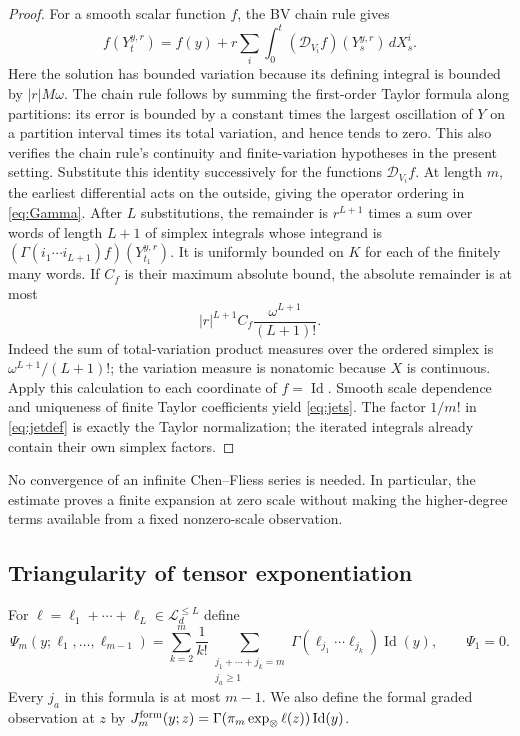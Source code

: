 \documentclass[11pt,a4paper]{article}
\numberwithin{equation}{section}
\theoremstyle{definition}
\theoremstyle{remark}
\DeclareMathOperator{\Id}{Id}
\newcommand{\Lie}{\mathcal L}
\newcommand{\Dop}{\mathcal D}
\begin{document}
\begin{proof}
For a smooth scalar function $f$, the BV chain rule gives
\[
 f(Y_t^{y,r})=f(y)+r\sum_i\int_0^t(\Dop_{V_i}f)(Y_s^{y,r})\,dX_s^i.
\]
Here the solution has bounded variation because its defining integral is
bounded by $|r|M\omega$. The chain rule follows by summing the first-order
Taylor formula along partitions: its error is bounded by a constant times
the largest oscillation of $Y$ on a partition interval times its total
variation, and hence tends to zero. This also verifies the chain rule's
continuity and finite-variation hypotheses in the present setting.
Substitute this identity successively for the functions
$\Dop_{V_i}f$. At length $m$, the earliest differential acts on the
outside, giving the operator ordering in \eqref{eq:Gamma}. After $L$
substitutions, the remainder is $r^{L+1}$ times a sum over words of length
$L+1$ of simplex integrals whose integrand is
$(\Gamma(i_1\cdots i_{L+1})f)(Y_{t_1}^{y,r})$. It is uniformly bounded
on $K$ for each of the finitely many words. If $C_f$ is their maximum
absolute bound, the absolute remainder is at most
\[
 |r|^{L+1}C_f\frac{\omega^{L+1}}{(L+1)!}.
\]
Indeed the sum of total-variation product measures over the ordered simplex
is $\omega^{L+1}/(L+1)!$; the variation measure is nonatomic because $X$
is continuous. Apply this calculation to each coordinate of $f=\Id$.
Smooth scale dependence and uniqueness of finite Taylor coefficients yield
\eqref{eq:jets}. The factor $1/m!$ in \eqref{eq:jetdef} is exactly the
Taylor normalization; the iterated integrals already contain their own
simplex factors.
\end{proof}

No convergence of an infinite Chen--Fliess series is needed. In particular,
the estimate proves a finite expansion at zero scale without making the
higher-degree terms available from a fixed nonzero-scale observation.

\subsection{Triangularity of tensor exponentiation}
For $\ell=\ell_1+\cdots+\ell_L\in\Lie_d^{\leq L}$ define
\begin{equation}\label{eq:Psidef}
 \Psi_m(y;\ell_1,\ldots,\ell_{m-1})=
 \sum_{k=2}^m\frac1{k!}
 \sum_{\substack{j_1+\cdots+j_k=m\\j_a\geq1}}
 \Gamma(\ell_{j_1}\cdots\ell_{j_k})\Id(y),
 \qquad\Psi_1=0.
\end{equation}
Every $j_a$ in this formula is at most $m-1$. We also define the formal
graded observation at $z$ by
$J_m^{\rm form}(y;z)=\Gamma(\pi_m\exp_\otimes\ell(z))\Id(y)$.
\end{document}

